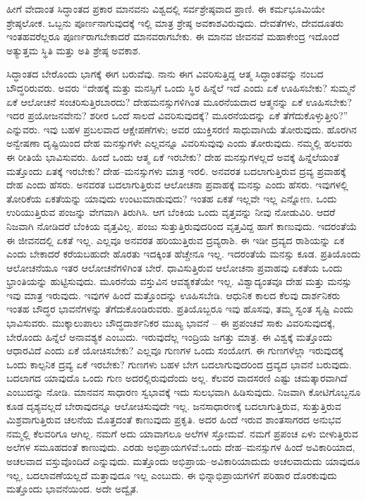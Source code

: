 ಹೀಗೆ ವೇದಾಂತ ಸಿದ್ಧಾಂತದ ಪ್ರಕಾರ ಮಾನವನು ವಿಶ್ವದಲ್ಲಿ ಸರ್ವಶ್ರೇಷ್ಠವಾದ ಪ್ರಾಣಿ. ಈ ಕರ್ಮಭೂಮಿಯೇ ಶ್ರೇಷ್ಠಲೋಕ. ಒಬ್ಬನು ಪೂರ್ಣನಾಗುವುದಕ್ಕೆ ಇಲ್ಲಿ ಮಾತ್ರ ಶ್ರೇಷ್ಠ ಅವಕಾಶವಿರುವುದು. ದೇವತೆಗಳು, ದೇವದೂತರು ಇಂತಹವರೆಲ್ಲರೂ ಪೂರ್ಣರಾಗಬೇಕಾದರೆ ಮಾನವರಾಗಬೇಕು. ಈ ಮಾನವ ಜೀವನವೆ ಮಹಾಕೇಂದ್ರ ಇದೊಂದೆ ಅತ್ಯುತ್ತಮ ಸ್ಥಿತಿ ಮತ್ತು ಅತಿ ಶ್ರೇಷ್ಠ ಅವಕಾಶ.

ಸಿದ್ಧಾಂತದ ಬೇರೊಂದು ಭಾಗಕ್ಕೆ ಈಗ ಬರುವೆವು. ನಾನು ಈಗ ವಿವರಿಸುತ್ತಿದ್ದ ಆತ್ಮ ಸಿದ್ಧಾಂತವನ್ನು ನಂಬದ ಬೌದ್ಧರಿರುವರು. ಅವರು “ದೇಹಕ್ಕೆ ಮತ್ತು ಮನಸ್ಸಿಗೆ ಒಂದು ಸ್ಥಿರ ಹಿನ್ನೆಲೆ ಇದೆ ಎಂದು ಏಕೆ ಊಹಿಸಬೇಕು? ಸುಮ್ಮನೆ ಏಕೆ ಆಲೋಚನೆ ಸಂಚರಿಸುತ್ತಿರಬಾರದು? ದೇಹಮನಸ್ಸುಗಳಿಗಿಂತ ಮೂರನೆಯದಾದ ಆತ್ಮನನ್ನು ಏಕೆ ಊಹಿಸಬೇಕು? ಇದರ ಪ್ರಯೋಜನವೇನು? ಶರೀರ ಒಂದೆ ಸಾಲದೆ ವಿವರಿಸುವುದಕ್ಕೆ? ಮೂರನೆಯದನ್ನು ಏಕೆ ತೆಗೆದುಕೊಳ್ಳುತ್ತೀರಿ?” ಎನ್ನುವರು. ಇವು ಬಹಳ ಪ್ರಬಲವಾದ ಆಕ್ಷೇಪಣೆಗಳು; ಅವರ ಯುಕ್ತಿಸರಣಿ ಸಾಧುವಾಗಿಯೆ ತೋರುವುದು. ಹೊರಗಿನ ಅನ್ವೇಷಣಾ ದೃಷ್ಟಿಯಿಂದ ದೇಹ ಮನಸ್ಸುಗಳೇ ಎಲ್ಲವನ್ನೂ ವಿವರಿಸುವುವು ಎಂದು ತೋರುವುದು. ನಮ್ಮಲ್ಲಿ ಹಲವರು ಈ ರೀತಿಯೆ ಭಾವಿಸುವರು. ಹಿಂದೆ ಒಂದು ಆತ್ಮ ಏಕೆ ಇರಬೇಕು? ದೇಹ ಮನಸ್ಸುಗಳಲ್ಲದೆ ಅವಕ್ಕೆ ಹಿನ್ನೆಲೆಯಂತೆ ಮತ್ತೊಂದು ಏತಕ್ಕೆ ಇರಬೇಕು? ದೇಹ–ಮನಸ್ಸುಗಳು ಮಾತ್ರ ಇರಲಿ. ಅನವರತ ಬದಲಾಗುತ್ತಿರುವ ದ್ರವ್ಯ ಪ್ರವಾಹಕ್ಕೆ ದೇಹ ಎಂದು ಹೆಸರು. ಅನವರತ ಬದಲಾಗುತ್ತಿರುವ ಆಲೋಚನಾ ಪ್ರವಾಹಕ್ಕೆ ಮನಸ್ಸು ಎಂದು ಹೆಸರು. ಇವುಗಳಲ್ಲಿ ತೋರಿಕೆಯ ಏಕತೆಯನ್ನು ಯಾವುದು ಉಂಟುಮಾಡುವುದು? ಇಂತಹ ಏಕತೆ ಇಲ್ಲವೇ ಇಲ್ಲ ಎನ್ನೋಣ. ಒಂದು ಉರಿಯುತ್ತಿರುವ ಪಂಜನ್ನು ವೇಗವಾಗಿ ತಿರುಗಿಸಿ. ಆಗ ಬೆಂಕಿಯ ಒಂದು ವೃತ್ತವನ್ನು ನೀವು ನೋಡುವಿರಿ. ಆದರೆ ನಿಜವಾಗಿ ನೋಡಿದರೆ ಬೆಂಕಿಯ ವೃತ್ತವಿಲ್ಲ. ಪಂಜು ಸುತ್ತುತ್ತಿರುವುದರಿಂದ ವೃತ್ತವಿದ್ದ ಹಾಗೆ ಕಾಣುವುದು. ಇದರಂತೆಯೆ ಈ ಜೀವನದಲ್ಲಿ ಏಕತೆ ಇಲ್ಲ. ಎಲ್ಲವೂ ಅನವರತ ಹರಿಯುತ್ತಿರುವ ದ್ರವ್ಯರಾಶಿ. ಈ ಇಡೀ ದ್ರವ್ಯದ ರಾಶಿಯನ್ನು ಏಕ ಎಂದು ಬೇಕಾದರೆ ಕರೆಯಬಹುದೇ ಹೊರತು ಇದಕ್ಕಿಂತ ಹೆಚ್ಚೇನೂ ಇಲ್ಲ. ಇದರಂತೆಯೆ ಮನಸ್ಸು ಕೂಡ. ಪ್ರತಿಯೊಂದು ಆಲೋಚನೆಯೂ ಇತರ ಆಲೋಚನೆಗಳಿಗಿಂತ ಬೇರೆ. ಧಾವಿಸುತ್ತಿರುವ ಆಲೋಚನಾ ಪ್ರವಾಹವು ಏಕತೆಯ ಒಂದು ಭ್ರಾಂತಿಯನ್ನು ಹುಟ್ಟಿಸುವುದು. ಮೂರನೆಯ ವಸ್ತುವಿನ ಆವಶ್ಯಕತೆಯೇ ಇಲ್ಲ. ವಿಶ್ವಾದ್ಯಂತವೂ ದೇಹ ಮತ್ತು ಮನಸ್ಸು ಇವು ಮಾತ್ರ ಇರುವುದು. ಇವುಗಳ ಹಿಂದೆ ಮತ್ತೊಂದನ್ನು ಊಹಿಸಬೇಡಿ. ಆಧುನಿಕ ಕಾಲದ ಕೆಲವು ದಾರ್ಶನಿಕರು ಇಂತಹ ಬೌದ್ಧರ ಭಾವನೆಗಳನ್ನು ತೆಗೆದುಕೊಂಡಿರುವರು. ಪ್ರತಿಯೊಬ್ಬರೂ ಇವು ಹೊಸವು, ತಮ್ಮ ಸ್ವಂತ ಸೃಷ್ಟಿ ಎಂದು ಭಾವಿಸುವರು. ಮುಕ್ಕಾಲುಪಾಲು ಬೌದ್ಧದಾರ್ಶನಿಕರ ಮುಖ್ಯ ಭಾವನೆ – ಈ ಪ್ರಪಂಚವೆ ಸಾಕು ವಿವರಿಸುವುದಕ್ಕೆ, ಬೇರೊಂದು ಹಿನ್ನೆಲೆ ಅನಾವಶ್ಯಕ ಎಂಬುದು. ಇರುವುದೆಲ್ಲ ಇಂದ್ರಿಯ ಜಗತ್ತು ಮಾತ್ರ. ಈ ವಿಶ್ವಕ್ಕೆ ಮತ್ತೊಂದು ಆಧಾರವಿದೆ ಎಂದು ಏಕೆ ಯೋಚಿಸಬೇಕು? ಎಲ್ಲವೂ ಗುಣಗಳ ಒಂದು ಸಂಯೋಗ. ಈ ಗುಣಗಳೆಲ್ಲಾ ಇರುವುದಕ್ಕೆ ಒಂದು ಕಾಲ್ಪನಿಕ ದ್ರವ್ಯ ಏಕೆ ಇರಬೇಕು? ಗುಣಗಳು ಬಹಳ ಬೇಗ ಬದಲಾಗುವುದರಿಂದ ದ್ರವ್ಯದ ಭಾವನೆ ಬರುವುದು. ಬದಲಾಗದ ಯಾವುದೊ ಒಂದು ಗುಣ ಅದರಲ್ಲಿರುವುದೆಂದು ಅಲ್ಲ. ಕೆಲವರ ವಾದಸರಣಿ ಎಷ್ಟು ಚಮತ್ಕಾರವಾಗಿದೆ ಎಂಬುದನ್ನು ನೋಡಿ. ಮಾನವನ ಸಾಧಾರಣ ಸ್ವಭಾವಕ್ಕೆ ಇದು ಸುಲಭವಾಗಿ ಹಿಡಿಸುವುದು. ನಿಜವಾಗಿ ಕೋಟಿಗೊಬ್ಬನೂ ಕೂಡ ದೃಶ್ಯವಲ್ಲದೆ ಬೇರಾವುದನ್ನೂ ಆಲೋಚಿಸುವುದೇ ಇಲ್ಲ. ಜನಸಾಧಾರಣಕ್ಕೆ ಬದಲಾಗುತ್ತಿರುವ, ಸುತ್ತುತ್ತಿರುವ ಮಿಶ್ರವಾಗುತ್ತಿರುವ ಚಲನೆಯ ಮೊತ್ತದಂತೆ ಕಾಣುವುದು ಪ್ರಕೃತಿ. ಅದರ ಹಿಂದೆ ಇರುವ ಶಾಂತಸಾಗರದ ಅನುಭವ ನಮ್ಮಲ್ಲಿ ಕೆಲವರಿಗೂ ಆಗಿಲ್ಲ. ನಮಗೆ ಅದು ಯಾವಾಗಲೂ ಅಲೆಗಳ ಸ್ತೋಮವೆ. ನಮಗೆ ಪ್ರಪಂಚ ಏಳು ಬೀಳುತ್ತಿರುವ ಅಲೆಗಳ ಸಮೂಹದಂತೆ ಕಾಣುವುದು. ಎರಡು ಅಭಿಪ್ರಾಯಗಳಿವೆ:ಒಂದು ದೇಹ–ಮನಸ್ಸುಗಳ ಹಿಂದೆ ಅವಿಕಾರಿಯಾದ, ಅಚಲವಾದ ವಸ್ತುವೊಂದಿದೆ ಎನ್ನುವುದು. ಮತ್ತೊಂದು ಅಭಿಪ್ರಾಯ–ಅವಿಕಾರಿಯಾದುದು ಅಚಲವಾದುದು ಯಾವುದೂ ಇಲ್ಲ, ಬದಲಾವಣೆಯಲ್ಲದೆ ಮತ್ತಾವುದೂ ಇಲ್ಲ ಎಂಬುದು. ಈ ಭಿನ್ನಾಭಿಪ್ರಾಯಗಳಿಗೆ ಪರಿಹಾರ ದೊರಕುವುದು ಮತ್ತೊಂದು ಭಾವನೆಯಿಂದ. ಅದೇ ಅದ್ವೈತ.

